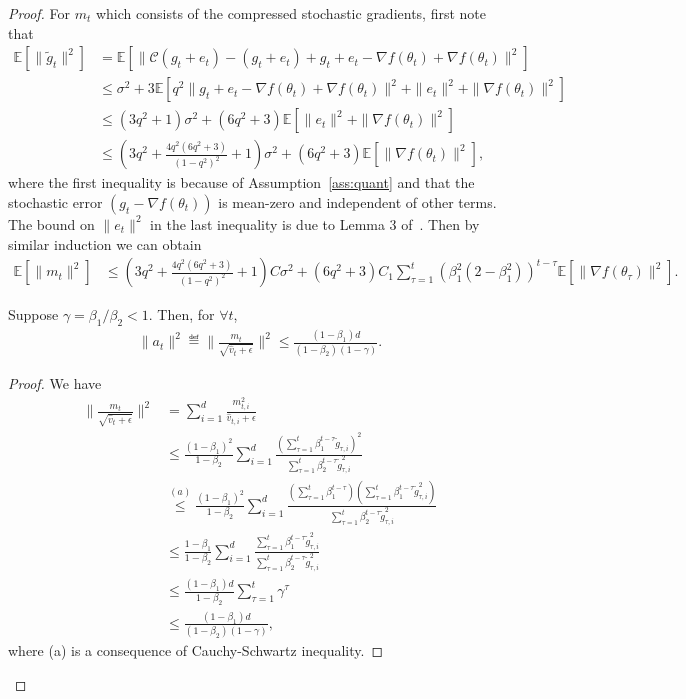 \documentclass[11pt]{article}
\begin{document}
\begin{proof}
For $m_t$ which consists of the compressed stochastic gradients, first note that
\begin{align*}
    \mathbb E[\|\tilde g_t\|^2]&=\mathbb E[\|\mathcal C(g_t+e_t)-(g_t+e_t)+g_t+e_t-\nabla f(\theta_t)+\nabla f(\theta_t)\|^2]\\
    &\leq \sigma^2+3\mathbb E[q^2\|g_t+e_t-\nabla f(\theta_t)+\nabla f(\theta_t)\|^2+\|e_t\|^2+\|\nabla f(\theta_t)\|^2]\\
    &\leq (3 q^2+1)\sigma^2+(6q^2+3)\mathbb E[\|e_t\|^2+\|\nabla f(\theta_t)\|^2]\\
    &\leq (3q^2+\frac{4q^2(6q^2+3)}{(1-q^2)^2}+1)\sigma^2+(6q^2+3)\mathbb E[\|\nabla f(\theta_t)\|^2],
\end{align*}
where the first inequality is because of Assumption~\ref{ass:quant} and that the stochastic error $(g_t-\nabla f(\theta_t))$ is mean-zero and independent of other terms. The bound on $\|e_t\|^2$ in the last inequality is due to Lemma 3 of~\cite{karimireddy2019error}. Then by similar induction we can obtain
\begin{align*}
    \mathbb E[\|m_t\|^2]&\leq (3q^2+\frac{4q^2(6q^2+3)}{(1-q^2)^2}+1)C\sigma^2+(6q^2+3)C_1\sum_{\tau=1}^t (\beta_1^2(2-\beta_1^2))^{t-\tau}\mathbb E[\|\nabla f(\theta_\tau)\|^2].
\end{align*}




\begin{Lemma} \label{bound:a_t}
Suppose $\gamma=\beta_1/\beta_2<1$. Then, for $\forall t$,
\begin{align*}
    \|a_t\|^2\eqdef \|\frac{m_t}{\sqrt{\hat v_t+\epsilon}} \|^2\leq \frac{(1-\beta_1)d}{(1-\beta_2)(1-\gamma)}.
\end{align*}

\end{Lemma}

\begin{proof}
We have
\begin{align*}
    \|\frac{m_t}{\sqrt{\hat v_t+\epsilon}} \|^2&=\sum_{i=1}^d \frac{m_{t,i}^2}{\hat v_{t,i}+\epsilon}\\
    &\leq \frac{(1-\beta_1)^2}{1-\beta_2}\sum_{i=1}^d \frac{(\sum_{\tau=1}^t \beta_1^{t-\tau} \tilde g_{\tau,i})^2}{\sum_{\tau=1}^t \beta_2^{t-\tau} \tilde g_{\tau,i}^2}\\
    &\overset{(a)}{\leq} \frac{(1-\beta_1)^2}{1-\beta_2}\sum_{i=1}^d \frac{(\sum_{\tau=1}^t \beta_1^{t-\tau})(\sum_{\tau=1}^t \beta_1^{t-\tau}\tilde g_{\tau,i}^2)}{\sum_{\tau=1}^t \beta_2^{t-\tau} \tilde g_{\tau,i}^2}\\
    &\leq \frac{1-\beta_1}{1-\beta_2}\sum_{i=1}^d \frac{\sum_{\tau=1}^t \beta_1^{t-\tau}\tilde g_{\tau,i}^2}{\sum_{\tau=1}^t \beta_2^{t-\tau} \tilde g_{\tau,i}^2}\\
    &\leq \frac{(1-\beta_1)d}{1-\beta_2} \sum_{\tau=1}^t \gamma^\tau\\
    &\leq \frac{(1-\beta_1)d}{(1-\beta_2)(1-\gamma)},
\end{align*}
where (a) is a consequence of Cauchy-Schwartz inequality.
\end{proof}



\end{proof}
\end{document}
